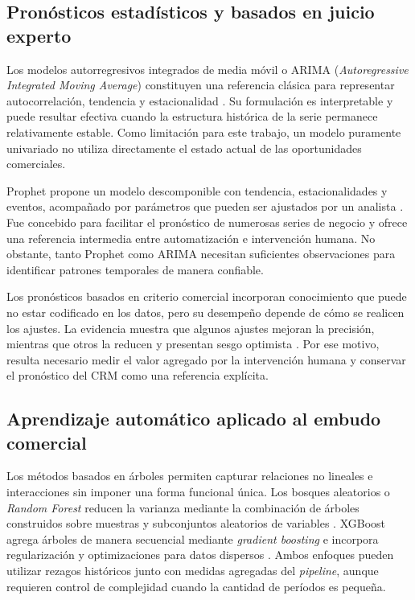 \subsection{Pronósticos estadísticos y basados en juicio experto}

Los modelos autorregresivos integrados de media móvil o ARIMA (\textit{Autoregressive Integrated Moving Average}) constituyen una referencia clásica para representar autocorrelación, tendencia y estacionalidad \citep{BoxJenkins2015}. Su formulación es interpretable y puede resultar efectiva cuando la estructura histórica de la serie permanece relativamente estable. Como limitación para este trabajo, un modelo puramente univariado no utiliza directamente el estado actual de las oportunidades comerciales.

Prophet propone un modelo descomponible con tendencia, estacionalidades y eventos, acompañado por parámetros que pueden ser ajustados por un analista \citep{TaylorLetham2018}. Fue concebido para facilitar el pronóstico de numerosas series de negocio y ofrece una referencia intermedia entre automatización e intervención humana. No obstante, tanto Prophet como ARIMA necesitan suficientes observaciones para identificar patrones temporales de manera confiable.

Los pronósticos basados en criterio comercial incorporan conocimiento que puede no estar codificado en los datos, pero su desempeño depende de cómo se realicen los ajustes. La evidencia muestra que algunos ajustes mejoran la precisión, mientras que otros la reducen y presentan sesgo optimista \citep{Fildes2009}. Por ese motivo, resulta necesario medir el valor agregado por la intervención humana y conservar el pronóstico del CRM como una referencia explícita.

\subsection{Aprendizaje automático aplicado al embudo comercial}

Los métodos basados en árboles permiten capturar relaciones no lineales e interacciones sin imponer una forma funcional única. Los bosques aleatorios o \textit{Random Forest} reducen la varianza mediante la combinación de árboles construidos sobre muestras y subconjuntos aleatorios de variables \citep{Breiman2001}. XGBoost agrega árboles de manera secuencial mediante \textit{gradient boosting} e incorpora regularización y optimizaciones para datos dispersos \citep{ChenGuestrin2016}. Ambos enfoques pueden utilizar rezagos históricos junto con medidas agregadas del \textit{pipeline}, aunque requieren control de complejidad cuando la cantidad de períodos es pequeña.

